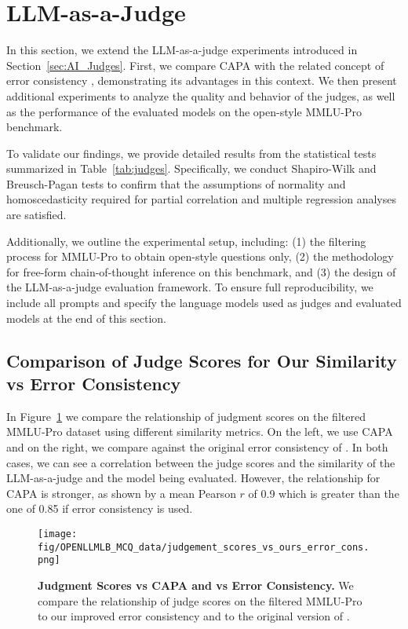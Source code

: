 \section{LLM-as-a-Judge}
\label{app:judge}

In this section, we extend the LLM-as-a-judge experiments introduced in Section~\ref{sec:AI_Judges}. First, we compare CAPA with the related concept of error consistency \citep{geirhos2020beyond}, demonstrating its advantages in this context. We then present additional experiments to analyze the quality and behavior of the judges, as well as the performance of the evaluated models on the open-style MMLU-Pro benchmark.

To validate our findings, we provide detailed results from the statistical tests summarized in Table~\ref{tab:judges}. Specifically, we conduct Shapiro-Wilk and Breusch-Pagan tests to confirm that the assumptions of normality and homoscedasticity required for partial correlation and multiple regression analyses are satisfied.

Additionally, we outline the experimental setup, including: (1) the filtering process for MMLU-Pro to obtain open-style questions only, (2) the methodology for free-form chain-of-thought inference on this benchmark, and (3) the design of the LLM-as-a-judge evaluation framework. To ensure full reproducibility, we include all prompts and specify the language models used as judges and evaluated models at the end of this section.

\subsection{Comparison of Judge Scores for Our Similarity vs Error Consistency}

In Figure~\ref{fig:judge_sim_err_con-plot} we compare the relationship of judgment scores on the filtered MMLU-Pro dataset using different similarity metrics. On the left, we use CAPA and on the right, we compare against the original error consistency of \citet{geirhos2020beyond}. In both cases, we can see a correlation between the judge scores and the similarity of the LLM-as-a-judge and the model being evaluated. However, the relationship for CAPA is stronger, as shown by a mean Pearson $r$ of 0.9 which is greater than the one of 0.85 if error consistency is used. 

\begin{figure}
    \centering
    \texttt{[image: fig/OPENLLMLB\_MCQ\_data/judgement\_scores\_vs\_ours\_error\_cons.png]}
    \caption{\textbf{Judgment Scores vs CAPA and vs Error Consistency.} We compare the relationship of judge scores on the filtered MMLU-Pro to our improved error consistency and to the original version of \citet{geirhos2020beyond}.}
    \label{fig:judge_sim_err_con-plot}
\end{figure}

